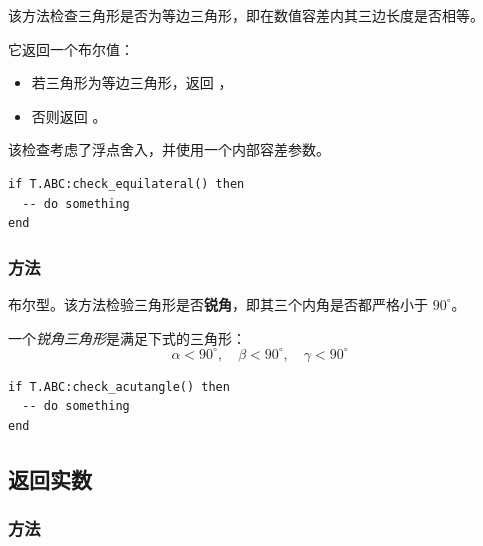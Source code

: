 该方法检查三角形是否为等边三角形，即在数值容差内其三边长度是否相等。

\medskip

它返回一个布尔值：
\begin{itemize}
  \item 若三角形为等边三角形，返回 ，
  \item 否则返回 。
\end{itemize}


该检查考虑了浮点舍入，并使用一个内部容差参数。


\begin{mybox}
\begin{verbatim}
if T.ABC:check_equilateral() then
  -- do something
end
\end{verbatim}
\end{mybox}

\vspace{1em}

\subsubsection{方法 }
\label{ssub:_triangle_check__acutangle}

布尔型。该方法检验三角形是否\textbf{锐角}，即其三个内角是否都严格小于 $90^\circ$。

\medskip

一个\emph{锐角三角形}是满足下式的三角形：
\[
\alpha < 90^\circ, \quad \beta < 90^\circ, \quad \gamma < 90^\circ
\]


\begin{mybox}
\begin{verbatim}
if T.ABC:check_acutangle() then
  -- do something
end
\end{verbatim}
\end{mybox}





\subsection{返回实数}

\subsubsection{方法 }
\label{ssub:method_triangle_check_isosceles}

